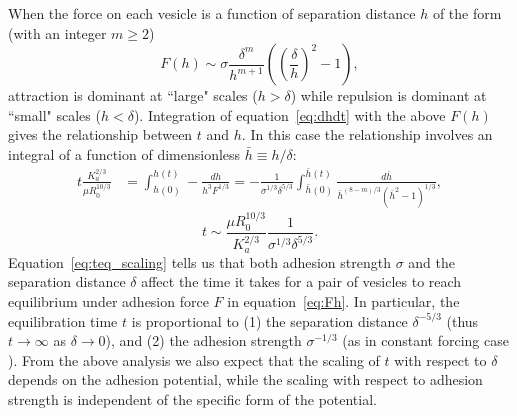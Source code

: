 \documentclass[aps,prl,twocolumn,showpacs,amsmath,amssymb]{revtex4-1}
\begin{document}
When the force on each vesicle is a function of separation distance $h$ of the form (with an integer $m\ge 2$)
\begin{equation}
\label{eq:Fh}
F(h) \sim \sigma \frac{\delta^m}{h^{m+1}}\left(\left(\frac{\delta}{h}\right)^2-1\right),
\end{equation}
attraction is dominant at ``large" scales ($h > \delta$) while repulsion is dominant at ``small" scales ($h<\delta$).
Integration of equation~\ref{eq:dhdt} with the above $F(h)$ gives the relationship between $t$ and $h$.
In this case the relationship involves an integral of a function of dimensionless $\bar{h} \equiv h/\delta$:
\begin{align}
t\frac{K_a^{2/3}}{\mu R_0^{10/3}}& = \int^{h(t)}_{h(0)}-\frac{dh}{h^3 F^{1/3}} = -\frac{1}{\sigma^{1/3}\delta^{5/3}}\int^{\bar{h}(t)}_{\bar{h}(0)}\frac{d \bar{h}}{\bar{h}^{(8-m)/3}(\bar{h}^2-1)^{1/3}},
\end{align}
\begin{equation}
\label{eq:teq_scaling}
t\sim \frac{\mu R_0^{10/3}}{K_a^{2/3}}\frac{1}{\sigma^{1/3}\delta^{5/3}}.
\end{equation}
Equation~\ref{eq:teq_scaling} tells us that both adhesion strength $\sigma$ and the separation distance $\delta$ affect
the time it takes for a pair of vesicles to reach equilibrium under adhesion force $F$ in equation~\ref{eq:Fh}.  In particular, the equilibration time $t$ 
is proportional to (1) the separation distance $\delta^{-5/3}$ (thus $t\rightarrow \infty$ as $\delta\rightarrow 0$), and (2) the adhesion strength $\sigma^{-1/3}$ 
(as in constant forcing case \cite{RamachandranLeal2010_PoF}).  From the above analysis we also expect that the scaling of $t$ with respect to $\delta$ depends on the
adhesion potential, while the scaling with respect to adhesion strength is independent of the specific form of the potential.
\end{document}
